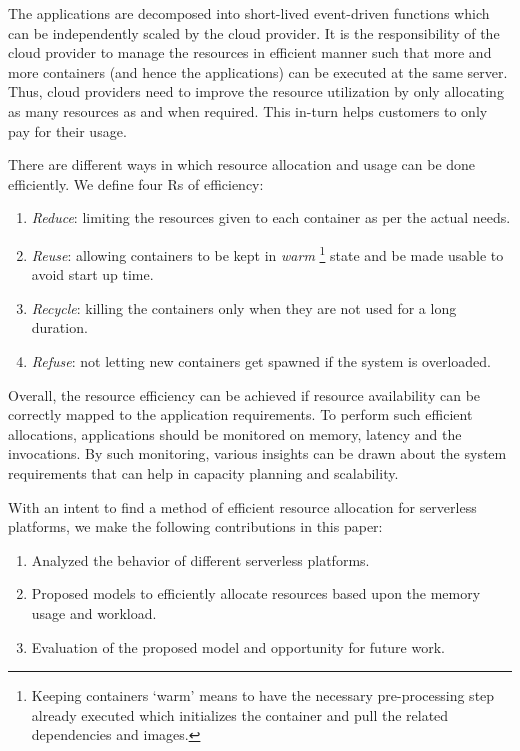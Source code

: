 \documentclass[letterpaper,twocolumn,10pt]{article}
\begin{document}
The applications are decomposed into short-lived event-driven functions which can be independently scaled by the cloud provider. It is the responsibility of the cloud provider to manage the resources in efficient manner such that more and more containers (and hence the applications) can be executed at the same server. Thus, cloud providers need to improve the resource utilization by only allocating as many resources as and when required. This in-turn helps customers to only pay for their usage.

There are different ways in which resource allocation and usage can be done efficiently. We define four Rs of efficiency:
\begin{enumerate}
\item {\it Reduce}: limiting the resources given to each container as per the actual needs.
\item {\it Reuse}: allowing containers to be kept in {\it warm} \footnote{Keeping containers `warm' means to have the necessary pre-processing step already executed which initializes the container and pull the related dependencies and images.} state and be made usable to avoid start up time.
\item {\it Recycle}: killing the containers only when they are not used for a long duration.
\item {\it Refuse}: not letting new containers get spawned if the system is overloaded.
\end{enumerate}

Overall, the resource efficiency can be achieved if resource availability can be correctly mapped to the application requirements. To perform such efficient allocations, applications should be monitored on memory, latency and the invocations. By such monitoring, various insights can be drawn about the system requirements that can help in capacity planning and scalability.

With an intent to find a method of efficient resource allocation for serverless platforms, we make the following contributions in this paper:
\begin{enumerate}
\item Analyzed the behavior of different serverless platforms.
\item Proposed models to efficiently allocate resources based upon the memory usage and workload.
\item Evaluation of the proposed model and opportunity for future work.
\end{enumerate}
\end{document}
